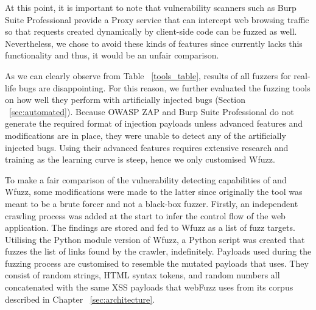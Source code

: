 At this point, it is important to note that vulnerability scanners such as Burp Suite Professional provide a Proxy service that can intercept web browsing traffic so that requests created dynamically by client-side code can be fuzzed as well. Nevertheless, we chose to avoid these kinds of features since \pname{} currently lacks this functionality and thus, it would be an unfair comparison.

As we can clearly observe from Table ~\ref{tools_table}, results of all fuzzers for real-life bugs are disappointing. For this reason, we further evaluated the fuzzing tools on how well they perform with artificially injected bugs (Section ~\ref{sec:automated}). Because OWASP ZAP and Burp Suite Professional do not generate the required format of injection payloads unless advanced features and modifications are in place, they were unable to detect any of the artificially injected bugs. Using their advanced features requires extensive research and training as the learning curve is steep, hence we only customised Wfuzz.

To make a fair comparison of the vulnerability detecting capabilities of \pname{} and Wfuzz, some modifications were made to the latter since originally the tool was meant to be a brute forcer and not a black-box fuzzer. Firstly, an independent crawling process was added at the start to infer the control flow of the web application. The findings are stored and fed to Wfuzz as a list of fuzz targets. Utilising the Python module version of Wfuzz, a Python script was created that fuzzes the list of links found by the crawler, indefinitely. Payloads used during the fuzzing process are customised to resemble the mutated payloads that \pname{} uses. They consist of random strings, HTML syntax tokens, and random numbers all concatenated with the same XSS payloads that webFuzz uses from its corpus described in Chapter ~\ref{sec:architecture}.

